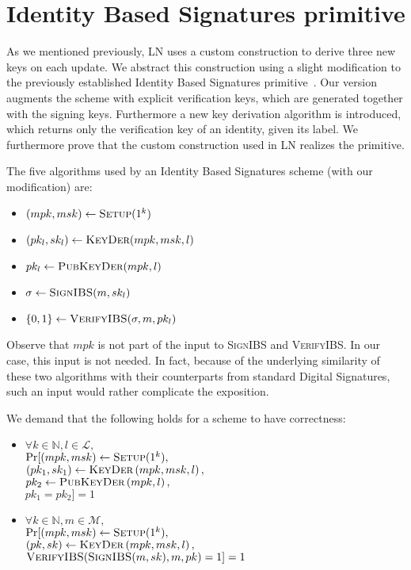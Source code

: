 \section{Identity Based Signatures primitive}
\label{sec:ibs}
  As we mentioned previously, LN uses a custom construction to derive three new
  keys on each update. We abstract this construction using a slight modification
  to the previously established Identity Based Signatures
  primitive~\cite{ibspaterson,ibsshamir}. Our version augments the scheme with
  explicit verification keys, which are generated together with the signing
  keys. Furthermore a new key derivation algorithm is introduced, which returns
  only the verification key of an identity, given its label. We furthermore
  prove that the custom construction used in LN realizes the primitive.

  The five algorithms used by an Identity Based Signatures scheme (with our
  modification) are:
  \begin{itemize}
    \item $(mpk, msk) \leftarrow \textsc{Setup}(1^k)$
    \item $(pk_l, sk_l) \leftarrow \textsc{KeyDer}(mpk, msk, l)$
    \item $pk_l \leftarrow \textsc{PubKeyDer}(mpk, l)$
    \item $\sigma \leftarrow \textsc{SignIBS}(m, sk_l)$
    \item $\{0, 1\} \leftarrow \textsc{VerifyIBS}(\sigma, m, pk_l)$
  \end{itemize}
  Observe that $mpk$ is not part of the input to \textsc{SignIBS} and
  \textsc{VerifyIBS}. In our case, this input is not needed. In fact, because
  of the underlying similarity of these two algorithms with their
  counterparts from standard Digital Signatures, such an input would rather
  complicate the exposition.

  We demand that the following holds for a scheme to have correctness:
  \begin{itemize}
    \item $\forall k \in \mathbb{N}, l \in \mathcal{L},$ \\
    $\Pr[(mpk, msk) \gets \textsc{Setup}(1^k),$ \\
    $(pk_1, sk_1) \gets \textsc{KeyDer}\left(mpk, msk, l\right),$ \\
    $pk_2 \gets \textsc{PubKeyDer}\left(mpk, l\right),$ \\
    $pk_1 = pk_2] = 1$

    \item $\forall k \in \mathbb{N}, m \in \mathcal{M},$ \\
    $\Pr[(mpk, msk) \gets \textsc{Setup}(1^k),$ \\
    $(pk, sk) \gets \textsc{KeyDer}\left(mpk, msk, l\right),$ \\
    $\textsc{VerifyIBS}(\textsc{SignIBS}(m, sk), m, pk) = 1] = 1$
  \end{itemize}

